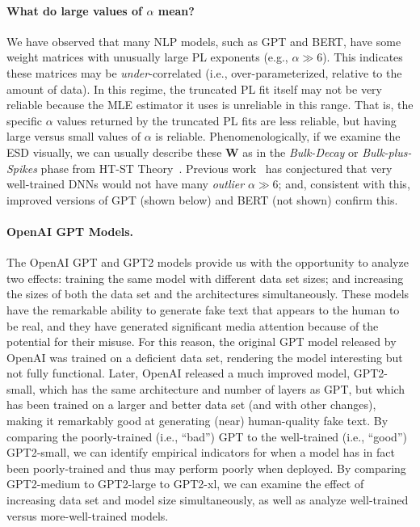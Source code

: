 \vspace{-1mm}
\paragraph{What do large values of $\alpha$ mean?}

We have observed that many NLP models, such as GPT and BERT, have some weight matrices with unusually large PL exponents (e.g., $\alpha\gg 6$).
This indicates these matrices may be \emph{under}-correlated (i.e., over-parameterized, relative to the amount of data).
In this regime, the truncated PL fit itself may not be very reliable because the MLE estimator it uses is unreliable in this range.
That is, the specific $\alpha$ values returned by the truncated PL fits are less reliable, but having large versus small values of $\alpha$ is reliable.
Phenomenologically, if we examine the ESD visually, we can usually describe these $\mathbf{W}$ as in the \emph{Bulk-Decay} or \emph{Bulk-plus-Spikes} phase from HT-ST Theory~\cite{MM18_TR,MM19_HTSR_ICML}.
Previous work~\cite{MM18_TR,MM19_HTSR_ICML} has conjectured that very well-trained DNNs would not have many \emph{outlier} $\alpha\gg 6$; and, consistent with this, improved versions of GPT (shown below) and BERT (not shown) confirm this.


\vspace{-1mm}
\paragraph{OpenAI GPT Models.}

The OpenAI GPT and GPT2 models provide us with the opportunity to analyze two effects: training the same model with different data set sizes; and increasing the sizes of both the data set and the architectures simultaneously.
These models have the remarkable ability to generate fake text that appears to the human to be real, and they have generated significant media attention because of the potential for their misuse.
For this reason, the original GPT model released by OpenAI was trained on a deficient data set, rendering the model interesting but not fully functional.  
Later, OpenAI released a much improved model, GPT2-small, which has the same architecture and number of layers as GPT, but which has been trained on a larger and better data set (and with other changes), making it remarkably good at generating (near) human-quality fake text.  
%
By comparing the poorly-trained (i.e., ``bad'') GPT to the well-trained (i.e., ``good'') GPT2-small, we can identify empirical indicators for when a model has in fact been poorly-trained and thus may perform poorly when deployed.
By comparing GPT2-medium to GPT2-large to GPT2-xl, we can examine the effect of increasing data set and model size simultaneously, as well as analyze well-trained versus more-well-trained models.

